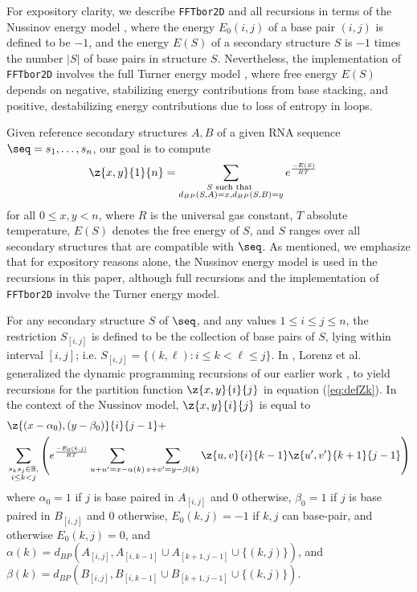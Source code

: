 For expository clarity, we describe {\tt FFTbor2D} and all recursions
in terms of the Nussinov energy model \cite{nussinovJacobson}, where
the energy $E_0(i,j)$ of a base pair $(i,j)$ is defined to be $-1$, and the
energy $E(S)$ of a secondary structure $S$ is $-1$ times the number $|S|$
of base pairs in structure $S$.  Nevertheless, the implementation of
{\tt FFTbor2D} involves the full Turner energy model \cite{xia:RNA}, where
free energy $E(S)$ depends on negative, stabilizing energy contributions
from base stacking, and positive, destabilizing energy contributions due to
loss of entropy in loops.

Given reference secondary structures $A,B$ of a
given RNA sequence $\seq=s_1,\ldots,s_n$, our goal is to compute
\begin{align}
\label{eq:defZk}
\z{x,y}{1}{n} &= \sum_{\substack{S \text{ such that }\\
d_{BP}(S,A)=x, d_{BP}(S,B)=y}} e^{\frac{-E(S)}{RT}}
\end{align}
for all $0\leq x,y < n$, where $R$ is the universal gas constant, $T$
absolute temperature, $E(S)$ denotes the free energy of $S$, and $S$ ranges
over all secondary structures that are compatible with $\seq$. As mentioned,
we emphasize that for expository reasons alone, the Nussinov energy model is
used in the recursions in this paper, although full recursions and
the implementation of {\tt FFTbor2D} involve the Turner energy model.

For any secondary structure $S$ of $\seq$, and any values
$1\leq i\leq j \leq n$, the restriction $S_{[i,j]}$ is defined to be the
collection of base pairs of $S$, lying within interval $[i,j]$; i.e.
$S_{[i,j]} = \{ (k,\ell) : i \leq k < \ell \leq j\}$.
In \cite{hofacker:RNAbor2D}, Lorenz et al. generalized
the dynamic programming recursions of our earlier work \cite{Freyhult.b07},
to yield recursions
for the partition function $\z{x,y}{i}{j}$ in equation
(\ref{eq:defZk}).  In the context of the Nussinov model,
$\z{x,y}{i}{j}$ is equal to
\begin{eqnarray}
\label{eq:RNAborNussRecursion}
&\z{(x-\alpha_0),(y-\beta_0)}{i}{j-1} +  \\
&\sum_{\substack{s_k s_j \in \mathbb{B},\\i\le k<j}}
\left(e^{\frac{-E_0(k,j)}{RT}}
\sum_{u+u'=x-\alpha(k)} \sum_{v+v'=y-\beta(k)}
\z{u,v}{i}{k-1}  \z{u',v'}{k+1}{j-1} \right) \nonumber
\end{eqnarray}
where $\alpha_0 = 1$ if $j$ is base paired in $A_{[i,j]}$ and $0$ otherwise,
$\beta_0 = 1$ if $j$ is base paired in $B_{[i,j]}$ and $0$ otherwise,
$E_0(k,j)=-1$ if $k,j$ can base-pair, and otherwise $E_0(k,j)=0$, and
$\alpha(k)=d_{BP}(A_{[i,j]}, A_{[i,k-1]} \cup A_{[k+1,j-1]} \cup\{(k,j)\})$,
and
$\beta(k)=d_{BP}(B_{[i,j]}, B_{[i,k-1]} \cup B_{[k+1,j-1]} \cup\{(k,j)\})$.

